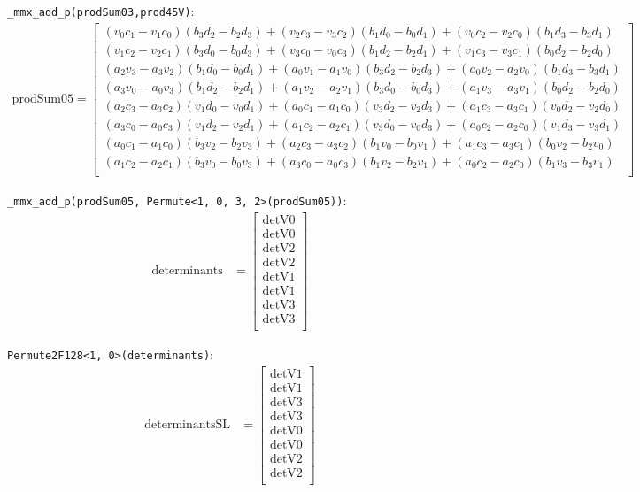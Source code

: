\documentclass[]{scrartcl}
\newcommand{\pth}[1]{\left(#1\right)}
\begin{document}
\texttt{_mmx_add_p(prodSum03,prod45V)}:
\begin{align*}
\mathrm{prodSum05} 
=
\begin{bmatrix}
  \pth{v_0c_1 - v_1c_0}\pth{b_3d_2 - b_2d_3} 
+ \pth{v_2c_3 - v_3c_2}\pth{b_1d_0 - b_0d_1}
+ \pth{v_0c_2 - v_2c_0}\pth{b_1d_3 - b_3d_1}\\
  \pth{v_1c_2 - v_2c_1}\pth{b_3d_0 - b_0d_3}
+ \pth{v_3c_0 - v_0c_3}\pth{b_1d_2 - b_2d_1}
+ \pth{v_1c_3 - v_3c_1}\pth{b_0d_2 - b_2d_0}\\
  \pth{a_2v_3 - a_3v_2}\pth{b_1d_0 - b_0d_1}
+ \pth{a_0v_1 - a_1v_0}\pth{b_3d_2 - b_2d_3}
+ \pth{a_0v_2 - a_2v_0}\pth{b_1d_3 - b_3d_1}\\
  \pth{a_3v_0 - a_0v_3}\pth{b_1d_2 - b_2d_1}
+ \pth{a_1v_2 - a_2v_1}\pth{b_3d_0 - b_0d_3}
+ \pth{a_1v_3 - a_3v_1}\pth{b_0d_2 - b_2d_0}\\
  \pth{a_2c_3 - a_3c_2}\pth{v_1d_0 - v_0d_1}
+ \pth{a_0c_1 - a_1c_0}\pth{v_3d_2 - v_2d_3}
+ \pth{a_1c_3 - a_3c_1}\pth{v_0d_2 - v_2d_0}\\
  \pth{a_3c_0 - a_0c_3}\pth{v_1d_2 - v_2d_1}
+ \pth{a_1c_2 - a_2c_1}\pth{v_3d_0 - v_0d_3}
+ \pth{a_0c_2 - a_2c_0}\pth{v_1d_3 - v_3d_1}\\
  \pth{a_0c_1 - a_1c_0}\pth{b_3v_2 - b_2v_3}
+ \pth{a_2c_3 - a_3c_2}\pth{b_1v_0 - b_0v_1}
+ \pth{a_1c_3 - a_3c_1}\pth{b_0v_2 - b_2v_0}\\
  \pth{a_1c_2 - a_2c_1}\pth{b_3v_0 - b_0v_3}
+ \pth{a_3c_0 - a_0c_3}\pth{b_1v_2 - b_2v_1}
+ \pth{a_0c_2 - a_2c_0}\pth{b_1v_3 - b_3v_1}\\
\end{bmatrix}
\end{align*}

\texttt{_mmx_add_p(prodSum05, Permute<1, 0, 3, 2>(prodSum05))}:
\begin{align*}
\mathrm{determinants} 
&=
\begin{bmatrix}
\mathrm{detV0}\\
\mathrm{detV0}\\
\mathrm{detV2}\\
\mathrm{detV2}\\
\mathrm{detV1}\\
\mathrm{detV1}\\
\mathrm{detV3}\\
\mathrm{detV3}\\
\end{bmatrix}
\end{align*}


\texttt{Permute2F128<1, 0>(determinants)}:
\begin{align*}
\mathrm{determinantsSL} 
&=
\begin{bmatrix}
\mathrm{detV1}\\
\mathrm{detV1}\\
\mathrm{detV3}\\
\mathrm{detV3}\\
\mathrm{detV0}\\
\mathrm{detV0}\\
\mathrm{detV2}\\
\mathrm{detV2}\\
\end{bmatrix}
\end{align*}
\end{document}
